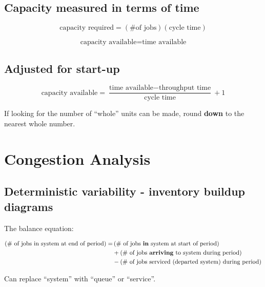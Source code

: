 \documentclass[11pt]{article}
\begin{document}
\subsection{Capacity measured in terms of time}

\begin{equation}
    \text{capacity required} = (\text{\# of jobs})(\text{cycle time})
\end{equation}

\begin{equation}
    \text{capacity available} = \text{time available}
\end{equation}

\subsection{Adjusted for start-up}

\begin{equation}
    \text{capacity available} = \frac{\text{time available} - \text{throughput time}}{\text{cycle time}} + 1
\end{equation}

If looking for the number of ``whole'' units can be made, round \textbf{down} to the nearest whole number.

\section{Congestion Analysis}

\subsection{Deterministic variability - inventory buildup diagrams}

The balance equation:

\begin{equation}
    \begin{split}
    \left(\text{\# of jobs in system at end of period}\right) =& \left(\text{\# of jobs \textbf{in} system at start of period}\right) \\
    &+ \left(\text{\# of jobs \textbf{arriving} to system during period}\right) \\
    &- \left(\text{\# of jobs serviced (departed system) during period}\right)
    \end{split}
\end{equation}

Can replace ``system'' with ``queue'' or ``service''.
\end{document}
